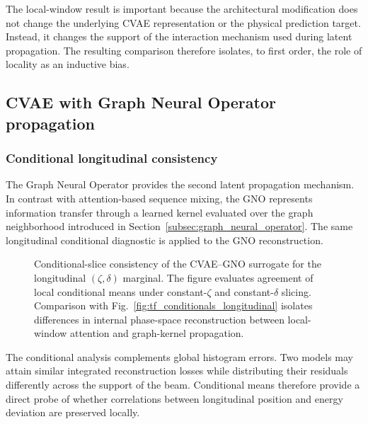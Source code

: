 The local-window result is important because the architectural modification does not change the underlying CVAE representation or the physical prediction target. Instead, it changes the support of the interaction mechanism used during latent propagation. The resulting comparison therefore isolates, to first order, the role of locality as an inductive bias.

\subsection{CVAE with Graph Neural Operator propagation}
\label{subsec:results_cvae_gno}

\subsubsection{Conditional longitudinal consistency}
\label{subsubsec:gno_longitudinal_conditionals}

The Graph Neural Operator provides the second latent propagation mechanism. In contrast with attention-based sequence mixing, the GNO represents information transfer through a learned kernel evaluated over the graph neighborhood introduced in Section~\ref{subsec:graph_neural_operator}. The same longitudinal conditional diagnostic is applied to the GNO reconstruction.

\begin{figure}[H]
\centering
{}
\caption{
Conditional-slice consistency of the CVAE--GNO surrogate for the longitudinal \((\zeta,\delta)\) marginal. The figure evaluates agreement of local conditional means under constant-\(\zeta\) and constant-\(\delta\) slicing. Comparison with Fig.~\ref{fig:tf_conditionals_longitudinal} isolates differences in internal phase-space reconstruction between local-window attention and graph-kernel propagation.
}
\label{fig:gno_conditionals_longitudinal}
\end{figure}

The conditional analysis complements global histogram errors. Two models may attain similar integrated reconstruction losses while distributing their residuals differently across the support of the beam. Conditional means therefore provide a direct probe of whether correlations between longitudinal position and energy deviation are preserved locally.

